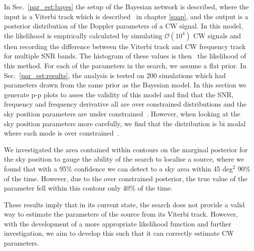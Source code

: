 In Sec.~\ref{par_est:bayes} the setup of the Bayesian network is described,
where the input is a Viterbi track which is described~ in chapter \ref{soap}, and the output is a posterior distribution of
the Doppler parameters of a \gls{CW} signal.  In this model, the likelihood is
empirically calculated by simulating $\mathcal{O}(10^4)$ \gls{CW} signals and
then recording the difference between the Viterbi track and \gls{CW} frequency
track for multiple \gls{SNR} bands.  The histogram of these values is
then~ the likelihood of this method.  For each of the
parameters in the search, we assume a flat prior.  In
Sec.~\ref{par_est:results}, the analysis is tested on 200 simulations which had
parameters drawn from the same prior as the Bayesian model.  In this section we
generate p-p plots to asses the validity of this model and find that the
\gls{SNR}, frequency and frequency derivative all are over constrained
distributions and the sky position parameters are under constrained~. However, when
looking at the sky position parameters more carefully, we find that the
distribution is bi modal where each mode is over constrained~.

We investigated the area contained within contours on the marginal posterior
for the sky position to gauge the ability of the search to localise a source,
where we found that with a 95\% confidence we can detect to a sky area within
45 deg$^2$ 90\% of the time.  However, due to the over constrained posterior,
the true value of the parameter fell within this contour only 40\% of the
time.~

These results imply that in its current state, the search does not provide a
valid way to estimate the parameters of the source from its Viterbi track.
However, with the development of a more appropriate likelihood function and
further investigation, we aim to develop this such that it can correctly
estimate \gls{CW} parameters.



















